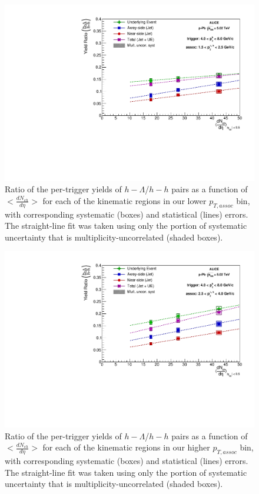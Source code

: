 \documentclass[ALICE,manyauthors]{ALICE_analysis_notes}
\begin{document}
\clearpage 

\begin{figure}[ht]
\centering
\includegraphics[width=6in]{figures/ratio_plot_new_x_axis_lowpt_with_fits.pdf}
\caption{Ratio of the per-trigger yields of $h-\Lambda$/$h-h$ pairs as a function of $<\frac{dN_{ch}}{d\eta}>$ for each of the kinematic regions in our lower $p_{T, assoc}$ bin, with corresponding systematic (boxes) and statistical (lines) errors. The straight-line fit was taken using only the portion of systematic uncertainty that is multiplicity-uncorrelated (shaded boxes).}
\label{final_ratios_dndeta_lowpt}
\end{figure}

\clearpage 

\begin{figure}[ht]
\centering
\includegraphics[width=6in]{figures/ratio_plot_new_x_axis_highpt_with_fits.pdf}
\caption{Ratio of the per-trigger yields of $h-\Lambda$/$h-h$ pairs as a function of $<\frac{dN_{ch}}{d\eta}>$ for each of the kinematic regions in our higher $p_{T, assoc}$ bin, with corresponding systematic (boxes) and statistical (lines) errors. The straight-line fit was taken using only the portion of systematic uncertainty that is multiplicity-uncorrelated (shaded boxes). }
\label{final_ratios_dndeta_highpt}
\end{figure}
\end{document}
